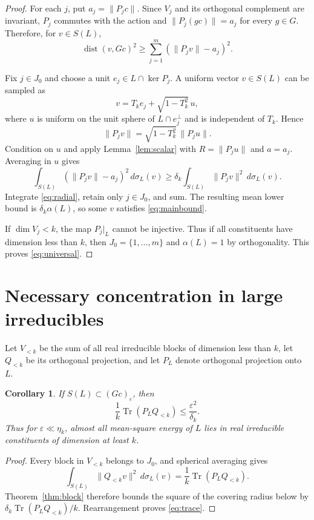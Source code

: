 \documentclass[11pt]{article}
\newtheorem{corollary}{Corollary}
\newcommand{\dist}{\operatorname{dist}}
\newcommand{\Tr}{\operatorname{Tr}}
\begin{document}
\begin{proof}
For each $j$, put $a_j=\|P_jc\|$. Since $V_j$ and its orthogonal complement
are invariant, $P_j$ commutes with the action and
$\|P_j(gc)\|=a_j$ for every $g\in G$.  Therefore, for $v\in S(L)$,
\begin{equation}\label{eq:radial}
 \dist(v,Gc)^2
 \ge \sum_{j=1}^m(\|P_jv\|-a_j)^2.
\end{equation}

Fix $j\in J_0$ and choose a unit $e_j\in L\cap\ker P_j$.  A uniform vector
$v\in S(L)$ can be sampled as
\[
 v=T_ke_j+\sqrt{1-T_k^2}\,u,
\]
where $u$ is uniform on the unit sphere of $L\cap e_j^\perp$ and is
independent of $T_k$. Hence
\[
 \|P_jv\|=\sqrt{1-T_k^2}\,\|P_ju\|.
\]
Condition on $u$ and apply Lemma~\ref{lem:scalar} with
$R=\|P_ju\|$ and $a=a_j$.  Averaging in $u$ gives
\[
 \int_{S(L)}(\|P_jv\|-a_j)^2\,d\sigma_L(v)
 \ge\delta_k\int_{S(L)}\|P_jv\|^2\,d\sigma_L(v).
\]
Integrate \eqref{eq:radial}, retain only $j\in J_0$, and sum.  The resulting
mean lower bound is $\delta_k\alpha(L)$, so some $v$ satisfies
\eqref{eq:mainbound}.

If $\dim V_j<k$, the map $P_j|_L$ cannot be injective. Thus if all
constituents have dimension less than $k$, then $J_0=\{1,\ldots,m\}$ and
$\alpha(L)=1$ by orthogonality. This proves \eqref{eq:universal}.
\end{proof}

\section{Necessary concentration in large irreducibles}

Let $V_{<k}$ be the sum of all real irreducible blocks of dimension less than
$k$, let $Q_{<k}$ be its orthogonal projection, and let $P_L$ denote
orthogonal projection onto $L$.

\begin{corollary}\label{cor:energy}
If $S(L)\subset(Gc)_\varepsilon$, then
\begin{equation}\label{eq:trace}
 \frac1k\Tr(P_LQ_{<k})\le\frac{\varepsilon^2}{\delta_k}.
\end{equation}
Thus for $\varepsilon\ll\eta_k$, almost all mean-square energy of $L$ lies in
real irreducible constituents of dimension at least $k$.
\end{corollary}

\begin{proof}
Every block in $V_{<k}$ belongs to $J_0$, and spherical averaging gives
\[
 \int_{S(L)}\|Q_{<k}v\|^2\,d\sigma_L(v)
 =\frac1k\Tr(P_LQ_{<k}).
\]
Theorem~\ref{thm:block} therefore bounds the square of the covering radius
below by $\delta_k\Tr(P_LQ_{<k})/k$. Rearrangement proves
\eqref{eq:trace}.
\end{proof}
\end{document}
